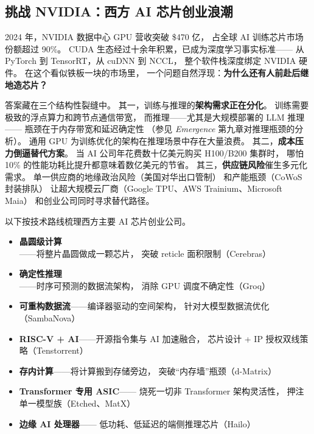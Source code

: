 
\subsection{挑战 NVIDIA：西方 AI 芯片创业浪潮}
\label{subsec:chips-west}

2024 年，NVIDIA 数据中心 GPU 营收突破 \$470 亿，
占全球 AI 训练芯片市场份额超过 90\%。
CUDA 生态经过十余年积累，已成为深度学习事实标准——
从 PyTorch 到 TensorRT，从 cuDNN 到 NCCL，
整个软件栈深度绑定 NVIDIA 硬件。
在这个看似铁板一块的市场里，
一个问题自然浮现：\textbf{为什么还有人前赴后继地造芯片？}

答案藏在三个结构性裂缝中。
其一，训练与推理的\textbf{架构需求正在分化}。
训练需要极致的浮点算力和跨节点通信带宽，
而推理——尤其是大规模部署的 LLM 推理——
瓶颈在于内存带宽和延迟确定性
（参见 \textit{Emergence} 第九章对推理瓶颈的分析）。
通用 GPU 为训练优化的架构在推理场景中存在大量浪费。
其二，\textbf{成本压力倒逼替代方案}。
当 AI 公司年花费数十亿美元购买 H100/B200 集群时，
哪怕 10\% 的性能功耗比提升都意味着数亿美元的节省。
其三，\textbf{供应链风险}催生多元化需求。
单一供应商的地缘政治风险（美国对华出口管制）
和产能瓶颈（CoWoS 封装排队）
让超大规模云厂商（Google TPU、AWS Trainium、Microsoft Maia）
和创业公司同时寻求替代路径。

以下按技术路线梳理西方主要 AI 芯片创业公司。

\begin{corebox}[AI 芯片技术路线全景]
\begin{itemize}[noitemsep]
  \item \textbf{晶圆级计算}——将整片晶圆做成一颗芯片，
        突破 reticle 面积限制（Cerebras）
  \item \textbf{确定性推理}——时序可预测的数据流架构，
        消除 GPU 调度不确定性（Groq）
  \item \textbf{可重构数据流}——编译器驱动的空间架构，
        针对大模型数据流优化（SambaNova）
  \item \textbf{RISC-V + AI}——开源指令集与 AI 加速融合，
        芯片设计 + IP 授权双线策略（Tenstorrent）
  \item \textbf{存内计算}——将计算搬到存储旁边，
        突破``内存墙''瓶颈（d-Matrix）
  \item \textbf{Transformer 专用 ASIC}——
        烧死一切非 Transformer 架构灵活性，
        押注单一模型族（Etched、MatX）
  \item \textbf{边缘 AI 处理器}——
        低功耗、低延迟的端侧推理芯片（Hailo）
\end{itemize}
\end{corebox}


